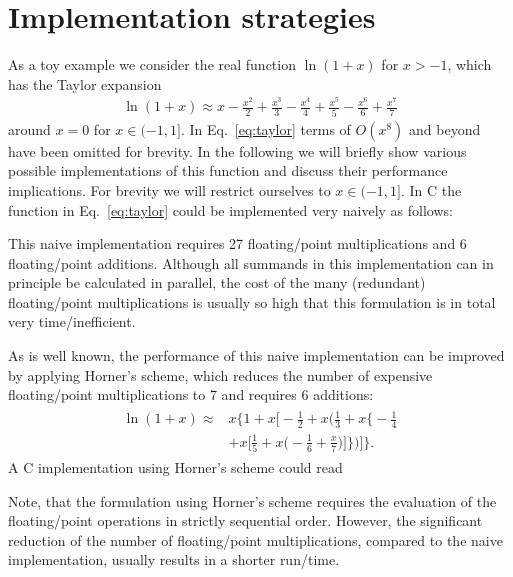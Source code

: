 \documentclass[10pt,DIV16,twocolumn,numbers=noenddot]{scrartcl}
\begin{document}
\section{Implementation strategies}
\label{sec:toymodel}

As a toy example we consider the real function $\ln(1+x)$ for $x>-1$,
which has the Taylor expansion
%
\begin{align}
  \ln(1+x) \approx x - \frac{x^2}{2} + \frac{x^3}{3} - \frac{x^4}{4} + \frac{x^5}{5} - \frac{x^6}{6} + \frac{x^7}{7}
  \label{eq:taylor}
\end{align}
%
around $x=0$ for $x\in(-1,1]$.  In Eq.~\eqref{eq:taylor} terms of
$O(x^8)$ and beyond have been omitted for brevity.  In the following
we will briefly show various possible implementations of this function
and discuss their performance implications.  For brevity we will
restrict ourselves to $x\in(-1,1]$.  In C the function in
Eq.~\eqref{eq:taylor} could be implemented very naively as follows:
%

%
This naive implementation requires 27 floating\-/point multiplications
and 6 floating\-/point additions.  Although all summands in this
implementation can in principle be calculated in parallel, the cost of
the many (redundant) floating\-/point multiplications is usually so
high that this formulation is in total very time\-/inefficient.

As is well known, the performance of this naive implementation can be
improved by applying Horner's scheme, which reduces the number of
expensive floating\-/point multiplications to 7 and requires 6
additions:
%
\begin{align}
\begin{split}
  \ln(1+x) \approx{}& x \bigg\{1 + x \bigg[-\frac{1}{2} + x \bigg(\frac{1}{3} + x \bigg\{-\frac{1}{4} \\
  &+ x \bigg[\frac{1}{5} + x\bigg(-\frac{1}{6} + \frac{x}{7}\bigg)\bigg]\bigg\}\bigg)\bigg]\bigg\}.
\end{split}\label{eq:horner}%
\end{align}
%
A C implementation using Horner's scheme could read
%

%
Note, that the formulation using Horner's scheme requires the
evaluation of the floating\-/point operations in strictly sequential
order.  However, the significant reduction of the number of
floating\-/point multiplications, compared to the naive
implementation, usually results in a shorter run\-/time.
\end{document}
